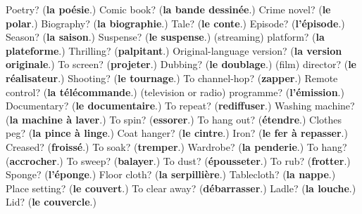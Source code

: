 \begin{tcolorbox}[breakable,colback=teal!4,colframe=teal!35!black,title={Before you move on}]
Poetry? (\textbf{la poésie}.) Comic book? (\textbf{la bande dessinée}.) Crime novel? (\textbf{le polar}.) Biography? (\textbf{la biographie}.) Tale? (\textbf{le conte}.) Episode? (\textbf{l'épisode}.) Season? (\textbf{la saison}.) Suspense? (\textbf{le suspense}.) (streaming) platform? (\textbf{la plateforme}.) Thrilling? (\textbf{palpitant}.) Original-language version? (\textbf{la version originale}.) To screen? (\textbf{projeter}.) Dubbing? (\textbf{le doublage}.) (film) director? (\textbf{le réalisateur}.) Shooting? (\textbf{le tournage}.) To channel-hop? (\textbf{zapper}.) Remote control? (\textbf{la télécommande}.) (television or radio) programme? (\textbf{l'émission}.) Documentary? (\textbf{le documentaire}.) To repeat? (\textbf{rediffuser}.) Washing machine? (\textbf{la machine à laver}.) To spin? (\textbf{essorer}.) To hang out? (\textbf{étendre}.) Clothes peg? (\textbf{la pince à linge}.) Coat hanger? (\textbf{le cintre}.) Iron? (\textbf{le fer à repasser}.) Creased? (\textbf{froissé}.) To soak? (\textbf{tremper}.) Wardrobe? (\textbf{la penderie}.) To hang? (\textbf{accrocher}.) To sweep? (\textbf{balayer}.) To dust? (\textbf{épousseter}.) To rub? (\textbf{frotter}.) Sponge? (\textbf{l'éponge}.) Floor cloth? (\textbf{la serpillière}.) Tablecloth? (\textbf{la nappe}.) Place setting? (\textbf{le couvert}.) To clear away? (\textbf{débarrasser}.) Ladle? (\textbf{la louche}.) Lid? (\textbf{le couvercle}.)
\end{tcolorbox}
